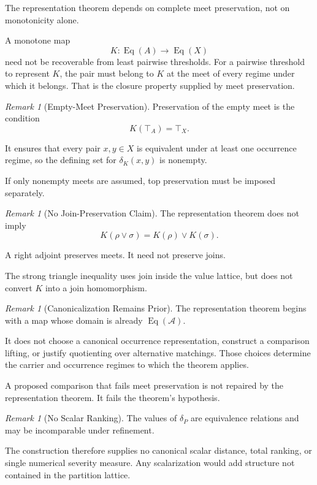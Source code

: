 \documentclass[11pt]{article}
\theoremstyle{plain}
\theoremstyle{definition}
\theoremstyle{remark}
\newtheorem{remark}[theorem]{Remark}
\begin{document}
The representation theorem depends on
complete meet preservation,
not on monotonicity alone.

A monotone map
\[
  K:
  \operatorname{Eq}(A)
  \longrightarrow
  \operatorname{Eq}(X)
\]
need not be recoverable
from least pairwise thresholds.
For a pairwise threshold to represent \(K\),
the pair must belong to \(K\)
at the meet of every regime
under which it belongs.
That is the closure property
supplied by meet preservation.

\begin{remark}[Empty-Meet Preservation]
  \label{ik.rem.empty-meet}
  Preservation of the empty meet is the condition
  \[
    K(\top_A)
    =
    \top_X.
  \]

  It ensures that every pair \(x,y\in X\)
  is equivalent under at least one occurrence regime,
  so the defining set for
  \(\delta_K(x,y)\)
  is nonempty.

  If only nonempty meets are assumed,
  top preservation must be imposed separately.
\end{remark}

\begin{remark}[No Join-Preservation Claim]
  \label{ik.rem.no-join-preservation}
  The representation theorem does not imply
  \[
    K(\rho\vee\sigma)
    =
    K(\rho)\vee K(\sigma).
  \]

  A right adjoint preserves meets.
  It need not preserve joins.

  The strong triangle inequality uses join
  inside the value lattice,
  but does not convert \(K\)
  into a join homomorphism.
\end{remark}

\begin{remark}[Canonicalization Remains Prior]
  \label{ik.rem.representation-canonicalization}
  The representation theorem begins with a map
  whose domain is already
  \(\operatorname{Eq}(\mathcal{A})\).

  It does not choose a canonical occurrence representation,
  construct a comparison lifting,
  or justify quotienting over alternative matchings.
  Those choices determine the carrier
  and occurrence regimes to which the theorem applies.

  A proposed comparison that fails meet preservation
  is not repaired by the representation theorem.
  It fails the theorem's hypothesis.
\end{remark}

\begin{remark}[No Scalar Ranking]
  \label{ik.rem.no-scalar-ranking}
  The values of \(\delta_P\)
  are equivalence relations
  and may be incomparable under refinement.

  The construction therefore supplies
  no canonical scalar distance,
  total ranking,
  or single numerical severity measure.
  Any scalarization would add structure
  not contained in the partition lattice.
\end{remark}
\end{document}
